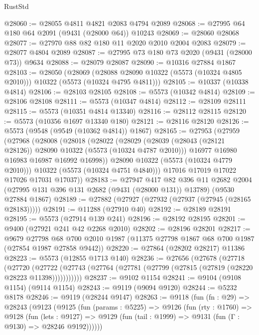 \begin{lexlean}{RustStd}
\begin{coremodule}
@28060 := @28055 @4811 @4821 @2083 @4794 @2089
@28068 := @27995 @64 @180 @64 @2091 (@9431 (@28000 @64)) @10243
@28069 := @28060 @28068
@28077 := @27970 @88 @82 @180 @11 @2020 @2010 @2004 @2083
@28079 := @28077 @4804 @2089
@28087 := @27995 @73 @180 @73 @2020 (@9431 (@28000 @73)) @9634
@28088 := @28079 @28087
@28090 := @10316 @27884 @1867
@28103 := @28050
    (@28069 (@28088 @28090 @10322 (@5573 (@10324 @4805 @2010))) @10322 (@5573 (@10324 @4795 @4811)))
@28105 := @10337 (@10338 @4814)
@28106 := @28103 @28105
@28108 := @5573 (@10342 @4814)
@28109 := @28106 @28108
@28111 := @5573 (@10347 @4814)
@28112 := @28109 @28111
@28115 := @5573 (@10351 @4814 @13340)
@28116 := @28112 @28115
@28120 := @5573 (@10356 @1697 @13340 @180)
@28121 := @28116 @28120
@28126 := @5573 (@9548 (@9549 (@10362 @4814)) @1867)
@28165 := @27953
    (@27959
      (@27968
        (@28008
          (@28018
            (@28022
              (@28029
                (@28039 (@28043 (@28121 @28126)) @28090 @10322 (@5573 (@10324 @4787 @2010)))
                @16977
                @16980
                @16983
                @16987
                @16992
                @16998))
            @28090
            @10322
            (@5573 (@10324 @4779 @2010)))
          @10322
          (@5573 (@10324 @4751 @4840)))
        @17016
        @17019
        @17022
        @17026
        @17031
        @17037))
@28183 := @27947
    @417
    @82
    @396
    @11
    @2682
    @2004
    (@27995 @131 @396 @131 @2682 (@9431 (@28000 @131)) @13789)
    (@9530 @27884 @1867)
@28189 := @27882 (@27927 (@27932 (@27937 (@27945 (@28165 @28183)))))
@28191 := @11288 (@27910 @40)
@28192 := @28189 @28191
@28195 := @5573 (@27914 @139 @241)
@28196 := @28192 @28195
@28201 := @9400 (@27921 @241 @42 @2268 @2010)
@28202 := @28196 @28201
@28217 := @9679
    @27798
    @68
    @700
    @2010
    @1987
    (@11375 @27798 @1867 @68 @700 @1987 (@27854 @1987 @27858 @9442))
@28220 := @27864 (@28202 @28217) @11386
@28223 := @5573 (@12855 @1713 @140)
@28236 := @27656
    (@27678
      (@27718
        (@27720
          (@27722 (@27743 (@27764 (@27781 (@27799 (@27815 (@27819 (@28220 @28223 @11398)))))))))))
@28237 := @9102 @1154
@28241 := @9104 (@9108 @1154) (@9114 @1154)
@28243 := @9119 (@9094 @9120)
@28244 := @5232 @8178
@28246 := @9119 (@28244 @9147)
@28263 := @9118
    (fun (fn : @29) =>
    @28243
      (@9123
        (@9125
          (fun (params : @5225) =>
          @9126
            (fun (rty : @1760) =>
            @9128
              (fun (lets : @9127) =>
              @9129 (fun (tail : @1999) => @9131 (fun (Γ : @9130) => @28246 @9192))))))

\end{coremodule}
\end{lexlean}
